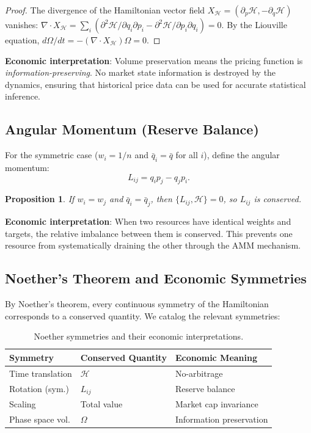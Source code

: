 \documentclass[11pt,twocolumn]{article}
\newtheorem{proposition}[theorem]{Proposition}
\begin{document}
\begin{proof}
The divergence of the Hamiltonian vector field $X_\mathcal{H} = (\partial_p \mathcal{H}, -\partial_q \mathcal{H})$ vanishes:
$\nabla \cdot X_\mathcal{H} = \sum_i (\partial^2 \mathcal{H}/\partial q_i \partial p_i - \partial^2 \mathcal{H}/\partial p_i \partial q_i) = 0$.
By the Liouville equation, $d\Omega/dt = -(\nabla \cdot X_\mathcal{H})\Omega = 0$.
\end{proof}

\textbf{Economic interpretation}: Volume preservation means the pricing function is \emph{information-preserving}. No market state information is destroyed by the dynamics, ensuring that historical price data can be used for accurate statistical inference.

\subsection{Angular Momentum (Reserve Balance)}

For the symmetric case ($w_i = 1/n$ and $\bar{q}_i = \bar{q}$ for all $i$), define the angular momentum:
\begin{equation}
L_{ij} = q_i p_j - q_j p_i.
\end{equation}

\begin{proposition}
If $w_i = w_j$ and $\bar{q}_i = \bar{q}_j$, then $\{L_{ij}, \mathcal{H}\} = 0$, so $L_{ij}$ is conserved.
\end{proposition}

\textbf{Economic interpretation}: When two resources have identical weights and targets, the relative imbalance between them is conserved. This prevents one resource from systematically draining the other through the AMM mechanism.

\subsection{Noether's Theorem and Economic Symmetries}

By Noether's theorem, every continuous symmetry of the Hamiltonian corresponds to a conserved quantity. We catalog the relevant symmetries:

\begin{table}[H]
\centering
\begin{tabular}{lll}
\toprule
\textbf{Symmetry} & \textbf{Conserved Quantity} & \textbf{Economic Meaning} \\
\midrule
Time translation & $\mathcal{H}$ & No-arbitrage \\
Rotation (sym.) & $L_{ij}$ & Reserve balance \\
Scaling & Total value & Market cap invariance \\
Phase space vol. & $\Omega$ & Information preservation \\
\bottomrule
\end{tabular}
\caption{Noether symmetries and their economic interpretations.}
\label{tab:noether}
\end{table}
\end{document}
